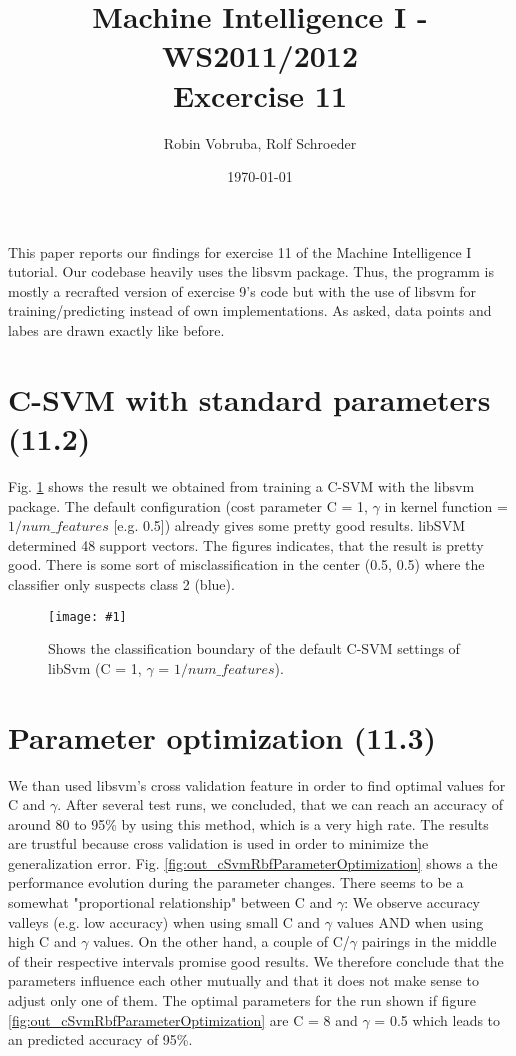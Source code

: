 \documentclass[a4paper,headings=small]{scrartcl}
\title{Machine Intelligence I - WS2011/2012\\Excercise 11}
\author{Robin Vobruba, Rolf Schroeder} %
\date{\today}
\newcommand{\image}[3]{
	\begin{figure}[htbp]
		\centering
		\texttt{[image: \#1]}
		\caption{#3}
		\label{fig:#1}
	\end{figure}
}
\begin{document}
\maketitle

This paper reports our findings for exercise 11 of the Machine Intelligence I tutorial. Our codebase heavily uses the libsvm package. Thus, the programm is mostly a recrafted version of exercise 9's code but with the use of libsvm for training/predicting instead of own implementations. As asked, data points and labes are drawn exactly like before.

\section{C-SVM with standard parameters (11.2)}

Fig. \ref{fig:out_classifierSvm_cSvmDefault} shows the result we obtained from training a C-SVM with the libsvm package. The default configuration (cost parameter C = 1, $\gamma$ in kernel function = $1/num\_features$ [e.g. 0.5]) already gives some pretty good results. libSVM determined 48 support vectors. The figures indicates, that the result is pretty good. There is some sort of misclassification in the center (0.5, 0.5) where the classifier only suspects class 2 (blue).

\image{out_classifierSvm_cSvmDefault}{0.9}%
	{Shows the classification boundary of the default C-SVM settings of libSvm (C = 1, $\gamma$ = $1/num\_features$).}


\section{Parameter optimization (11.3)}

We than used libsvm's cross validation feature in order to find optimal values for C and $\gamma$. After several test runs, we concluded, that we can reach an accuracy of around 80 to 95\% by using this method, which is a very high rate. The results are trustful because cross validation is used in order to minimize the generalization error. Fig. \ref{fig:out_cSvmRbfParameterOptimization} shows a the performance evolution during the parameter changes. There seems to be a somewhat "proportional relationship" between C and $\gamma$: We observe accuracy valleys (e.g. low accuracy) when using small C and $\gamma$ values AND when using high C and $\gamma$ values. On the other hand, a couple of C/$\gamma$ pairings in the middle of their respective intervals promise good results. We therefore conclude that the parameters influence each other mutually and that it does not make sense to adjust only one of them. The optimal parameters for the run shown if figure \ref{fig:out_cSvmRbfParameterOptimization} are C = 8 and $\gamma$ = 0.5 which leads to an predicted accuracy of 95\%.
\end{document}
